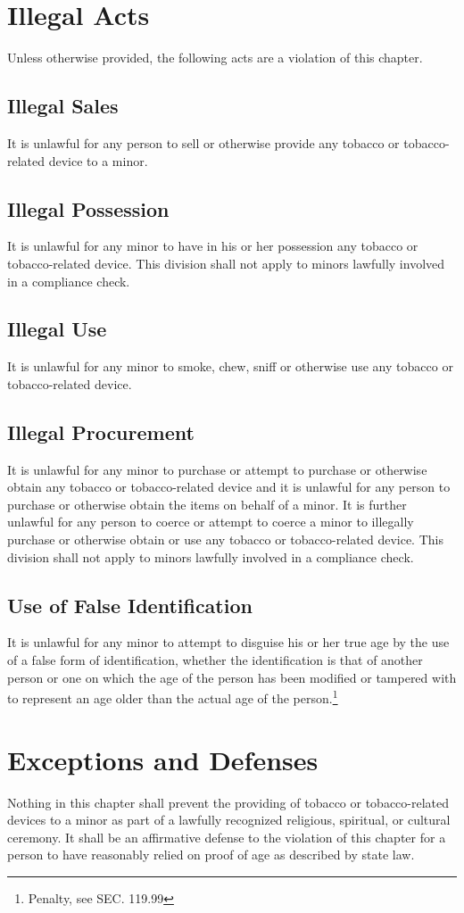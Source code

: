 \section{Illegal Acts}
Unless otherwise provided, the following acts are a violation of this chapter.
\subsection{Illegal Sales}
It is unlawful for any person to sell or otherwise provide any tobacco or tobacco-related device to a minor.
\subsection{Illegal Possession}
It is unlawful for any minor to have in his or her possession any tobacco or tobacco-related device. This division shall not apply to minors lawfully involved in a compliance check.
\subsection{Illegal Use}
It is unlawful for any minor to smoke, chew, sniff or otherwise use any tobacco or tobacco-related device.
\subsection{Illegal Procurement}
It is unlawful for any minor to purchase or attempt to purchase or otherwise obtain any tobacco or tobacco-related device and it is unlawful for any person to purchase or otherwise obtain the items on behalf of a minor.  It is further unlawful for any person to coerce or attempt to coerce a minor to illegally purchase or otherwise obtain or use any tobacco or tobacco-related device.  This division shall not apply to minors lawfully involved in a compliance check.
\subsection{Use of False Identification}
It is unlawful for any minor to attempt to disguise his or her true age by the use of a false form of identification, whether the identification is that of another person or one on which the age of the person has been modified or tampered with to represent an age older than the actual age of the person.\footnote{Penalty, see SEC. 119.99}

\section{Exceptions and Defenses}
Nothing in this chapter shall prevent the providing of tobacco or tobacco-related devices to a minor as part of a lawfully recognized religious, spiritual, or cultural ceremony.  It shall be an affirmative defense to the violation of this chapter for a person to have reasonably relied on proof of age as described by state law.

